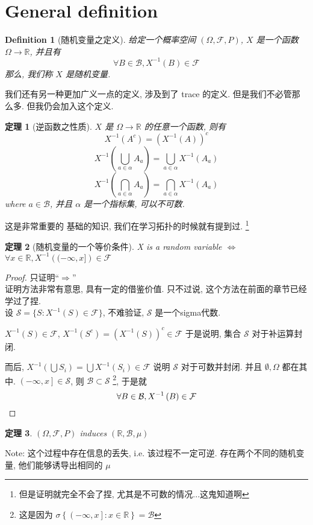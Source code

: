 \documentclass[a4paper, 10pt]{ctexart} %
\newtheorem{theorem}{定理}
\newtheorem{definition}{Definition}
\begin{document}
\section{General definition}
\begin{definition}[随机变量之定义]
    给定一个概率空间 $ \left(\Omega , \mathcal{F} , P  \right)$, $X$ 是一个函数 $\Omega \to \mathbb{R}$, 并且有
    \[
    \forall B \in \mathcal B , X ^{-1} \left(B\right) \in \mathcal F 
    \]
    那么, 我们称 $X$ 是随机变量.
\end{definition}

我们还有另一种更加广义一点的定义, 涉及到了 trace 的定义. 但是我们不必管那么多. 但我仍会加入这个定义. 

\begin{theorem}[逆函数之性质]
    $X$ 是 $\Omega \to \mathbb{R}$ 的任意一个函数, 则有
    \[
    X ^{-1} \left( A ^{c}\right) = \left(X ^{-1}  \left(A\right)\right) ^{c}
    \]
    \[
    X ^{-1}  \left( \bigcup_{a \in \alpha} A_{a}\right) = \bigcup _{a \in \alpha} X ^{-1}  \left(A_{a}\right)
    \]
    \[
    X ^{-1}  \left( \bigcap _{a \in \alpha} A_{a} \right) = \bigcap _{a \in \alpha} X ^{-1}  \left( A_{a}\right)
    \]
    where $a \in \mathcal B$, 并且 $\alpha$ 是一个指标集, 可以不可数.
\end{theorem} 
这是非常重要的 基础的知识, 我们在学习拓扑的时候就有提到过. \footnote{但是证明就完全不会了捏, 尤其是不可数的情况...这鬼知道啊}
\begin{theorem}[随机变量的一个等价条件]
    X is a random variable $\iff$ $\forall x \in \mathbb{R}, X ^{-1}  \left( (- \infty , x] \right) \in \mathcal F$
\end{theorem}
\begin{proof}

    只证明``$\Rightarrow$''\\
    证明方法非常有意思, 具有一定的借鉴价值.
    只不过说, 这个方法在前面的章节已经学过了捏. \\
    设 $\mathcal S = \{S: X ^{-1} \left(S\right) \in \mathcal F\}$,  不难验证, $\mathcal S$ 是一个sigma代数. 

    $X ^{-1} \left(S\right) \in \mathcal F$, $X ^{-1}  \left(S ^{c}\right) = \left(X ^{-1}  \left(S\right)\right)^{c} \in \mathcal F$
于是说明, 集合 $\mathcal S$ 对于补运算封闭. 

    而后, $X ^{-1}  \left(\bigcup S_{i}\right) = \bigcup X ^{-1}  \left(S_i\right) \in \mathcal F$
    说明 $\mathcal S$ 对于可数并封闭. 并且 $\emptyset , \Omega$ 都在其中. 
    $ \left(- \infty , x \right] \in \mathcal S$, 则
    $\mathcal B \subset \mathcal S$ \footnote{这是因为 $\sigma \left\{ \left( -\infty , x\right] : x \in \mathbb{R}\right\} = \mathcal B$}, 于是就
    \[
    \forall  B \in \mathcal B , X ^{-1} \left( B\right) \in \mathcal F
    \qedhere
    \]
\end{proof}
\begin{theorem}
    $\left(\Omega , \mathcal F , P\right)$ induces  $\left( \mathbb{R} , \mathcal B , \mu\right)$
\end{theorem}
Note: 这个过程中存在信息的丢失, i.e. 该过程不一定可逆. 存在两个不同的随机变量, 他们能够诱导出相同的 $\mu$
\end{document}
